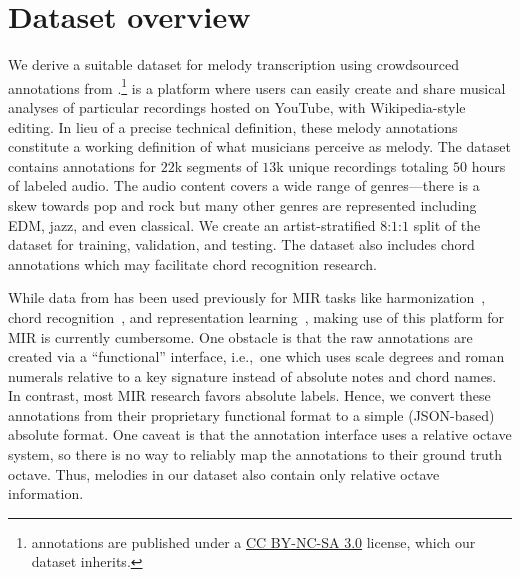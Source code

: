 \section{Dataset overview}
\label{sec:dataset}

We 
derive 
a suitable dataset for melody transcription using crowdsourced annotations from \hooktheory{}.\footnote{\hooktheory{} annotations are published under a \href{https://creativecommons.org/licenses/by-nc-sa/3.0/}{CC BY-NC-SA 3.0} license, which our dataset inherits.}
\hooktheory{} is a platform where users can easily create and share musical analyses of particular recordings hosted on YouTube, with Wikipedia-style editing. 
In lieu of a precise technical definition, these melody annotations constitute a working definition of what musicians perceive as melody. 
The dataset contains annotations for $22$k segments of $13$k unique recordings totaling $50$ hours of labeled audio. 
The audio content covers a wide range of genres---there is a skew towards pop and rock but many other genres are represented including EDM, jazz, and even classical. 
We create an artist-stratified $8$:$1$:$1$ split of the dataset for training, validation, and testing. 
The dataset also includes chord annotations which may facilitate chord recognition research.


While data from \hooktheory{} has been used previously for MIR tasks like 
harmonization~\cite{chen2021surprisenet,yeh2021automatic}, 
chord recognition~\cite{jiang2019mirex}, and 
representation learning~\cite{jiang2020transformer}, 
making use of this platform for MIR is currently cumbersome. 
One obstacle is that the raw annotations are created via a ``functional'' interface, i.e.,~one which uses scale degrees and roman numerals relative to a key signature instead of absolute notes and chord names. 
In contrast, most MIR research favors absolute labels.
Hence, we convert these annotations from their proprietary functional format to a simple (JSON-based) absolute format. 
One caveat is that the \hooktheory{} annotation interface uses a relative octave system, 
so there is no way to reliably map the annotations to their ground truth octave.
Thus, melodies in our dataset also contain only relative octave information.

